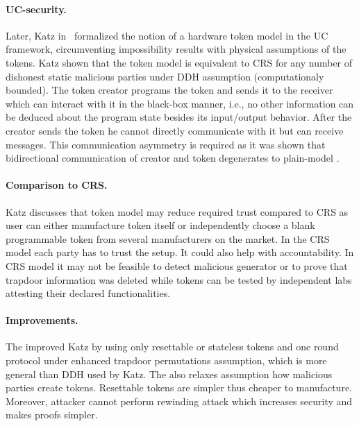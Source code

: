 \documentclass[
  digital, %
  twoside, %
  table,   %
  lof,     %
  lot,     %
]{fithesis3}
\newcommand{\cmmnt}[1]{\ignorespaces}
\begin{document}
\paragraph{UC-security.} Later, Katz in~\cite{K07} formalized the notion of a hardware token model in the UC framework, circumventing impossibility results with physical assumptions of the tokens. Katz shown that the token model is equivalent to CRS for any number of dishonest static malicious parties under DDH assumption (computationaly bounded). %
The token creator programs the token and sends it to the receiver which can interact with it in the black-box manner, i.e., no other information can be deduced about the program state besides its input/output behavior. %
After the creator sends the token he cannot directly communicate with it but can receive messages. This communication asymmetry is required as it was shown that bidirectional communication of creator and token degenerates to plain-model \cite{CGS08}.

\paragraph{Comparison to CRS.} %
Katz discusses that token model may reduce required trust compared to CRS as user can either manufacture token itself or independently choose a blank programmable token from several manufacturers on the market. In the CRS model each party has to trust the setup.
It could also help with accountability. In CRS model it may not be feasible to detect malicious generator or to prove that trapdoor information was deleted while tokens can be tested by independent labs attesting their declared functionalities.

\paragraph{Improvements.}%
The \cite{CGS08} improved Katz by using only resettable or stateless tokens and one round protocol under enhanced trapdoor permutations assumption, which is more general than DDH used by Katz. The \cite{CGS08} also relaxes assumption how malicious parties create tokens\cmmnt{Attacker does not need to know the code}. Resettable tokens are simpler thus cheaper to manufacture. Moreover, attacker cannot perform rewinding attack which increases security and makes proofs simpler.
\end{document}
